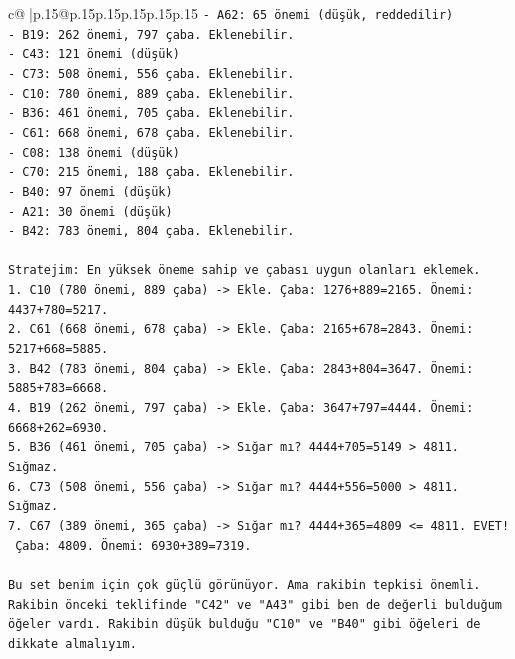 \documentclass{article}
\begin{document}
{\begin{supertabular}{c@{$\;$}|p{.15\linewidth}@{}p{.15\linewidth}p{.15\linewidth}p{.15\linewidth}p{.15\linewidth}p{.15\linewidth}}
{{{\texttt{{-} A62: 65 önemi (düşük, reddedilir)} \\
\texttt{{-} B19: 262 önemi, 797 çaba. Eklenebilir.} \\
\texttt{{-} C43: 121 önemi (düşük)} \\
\texttt{{-} C73: 508 önemi, 556 çaba. Eklenebilir.} \\
\texttt{{-} C10: 780 önemi, 889 çaba. Eklenebilir.} \\
\texttt{{-} B36: 461 önemi, 705 çaba. Eklenebilir.} \\
\texttt{{-} C61: 668 önemi, 678 çaba. Eklenebilir.} \\
\texttt{{-} C08: 138 önemi (düşük)} \\
\texttt{{-} C70: 215 önemi, 188 çaba. Eklenebilir.} \\
\texttt{{-} B40: 97 önemi (düşük)} \\
\texttt{{-} A21: 30 önemi (düşük)} \\
\texttt{{-} B42: 783 önemi, 804 çaba. Eklenebilir.} \\
\\ 
\texttt{Stratejim: En yüksek öneme sahip ve çabası uygun olanları eklemek.} \\
\texttt{1. C10 (780 önemi, 889 çaba) {-}> Ekle. Çaba: 1276+889=2165. Önemi: 4437+780=5217.} \\
\texttt{2. C61 (668 önemi, 678 çaba) {-}> Ekle. Çaba: 2165+678=2843. Önemi: 5217+668=5885.} \\
\texttt{3. B42 (783 önemi, 804 çaba) {-}> Ekle. Çaba: 2843+804=3647. Önemi: 5885+783=6668.} \\
\texttt{4. B19 (262 önemi, 797 çaba) {-}> Ekle. Çaba: 3647+797=4444. Önemi: 6668+262=6930.} \\
\texttt{5. B36 (461 önemi, 705 çaba) {-}> Sığar mı? 4444+705=5149 > 4811. Sığmaz.} \\
\texttt{6. C73 (508 önemi, 556 çaba) {-}> Sığar mı? 4444+556=5000 > 4811. Sığmaz.} \\
\texttt{7. C67 (389 önemi, 365 çaba) {-}> Sığar mı? 4444+365=4809 <= 4811. EVET!} \\
\texttt{   Çaba: 4809. Önemi: 6930+389=7319.} \\
\\ 
\texttt{Bu set benim için çok güçlü görünüyor. Ama rakibin tepkisi önemli. Rakibin önceki teklifinde "C42" ve "A43" gibi ben de değerli bulduğum öğeler vardı. Rakibin düşük bulduğu "C10" ve "B40" gibi öğeleri de dikkate almalıyım.} \\
\\ 
}}}
\end{supertabular}}
\end{document}
